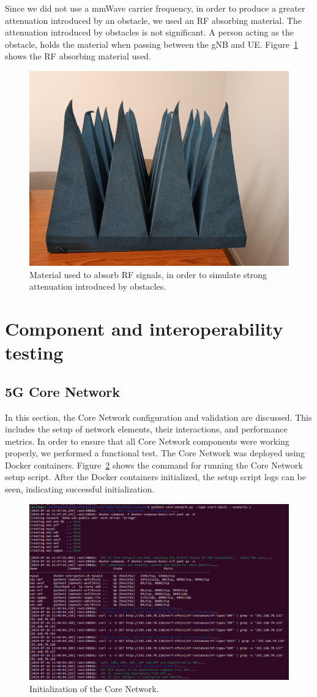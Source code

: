Since we did not use a mmWave carrier frequency, in order to produce a greater attenuation introduced by an obstacle, we used an RF absorbing material.
The attenuation introduced by obstacles is not significant.
A person acting as the obstacle, holds the material when passing between the gNB and UE\@.
Figure~\ref{fig:foam} shows the RF absorbing material used.

\begin{figure}[H]
    \centering
    \includegraphics[width=0.5\linewidth]{figures/foam}
    \caption{Material used to absorb RF signals, in order to simulate strong attenuation introduced by obstacles.}
    \label{fig:foam}
\end{figure}



\section{Component and interoperability testing}\label{sec:component-testing}


\subsection{5G Core Network}\label{subsec:core_network}
In this section, the Core Network configuration and validation are discussed.
This includes the setup of network elements, their interactions, and performance metrics.
In order to ensure that all Core Network components were working properly, we performed a functional test.
The Core Network was deployed using Docker containers.
Figure~\ref{fig:core_init} shows the command for running the Core Network setup script.
After the Docker containers initialized, the setup script logs can be seen, indicating successful initialization.

\begin{figure}[H]
    \centering
    \includegraphics[width=0.7\linewidth]{figures/core_init}
    \caption[Initialization of the Core Network]{Initialization of the Core Network.}
    \label{fig:core_init}
\end{figure}

